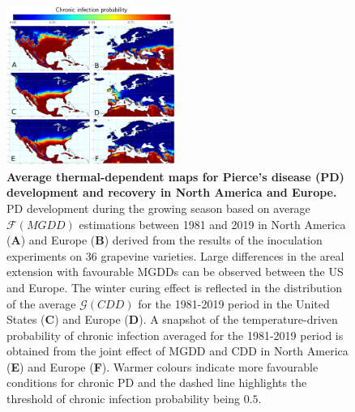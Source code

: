     \begin{figure}[H]
        \centering
        \includegraphics[width=0.49\textwidth]{Figures/Fig1_new.pdf}
        \caption{\textbf{Average thermal-dependent maps for Pierce's disease
                (PD)
                development and recovery in North America and Europe.} PD
            development during
            the growing season based on average $\mathcal{F}(MGDD)$ estimations
            between
            1981 and 2019 in North America (\textbf{A}) and Europe (\textbf{B})
            derived
            from the results of the inoculation experiments on 36 grapevine
            varieties.
            Large differences in the areal extension with favourable MGDDs can
            be observed
            between the US and Europe. The winter curing effect is reflected in
            the
            distribution of the average $\mathcal{G}(CDD)$ for the 1981-2019
            period in the
            United States (\textbf{C}) and Europe (\textbf{D}). A snapshot of
            the
            temperature-driven probability of chronic infection averaged for
            the 1981-2019
            period is obtained from the joint effect of MGDD and CDD in North
            America
            (\textbf{E}) and Europe (\textbf{F}). Warmer colours indicate more
            favourable
            conditions for chronic PD and the dashed line highlights the
            threshold of
            chronic infection probability being $0.5$.}
        \label{fig2}
    \end{figure}

